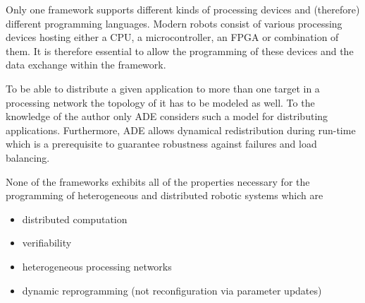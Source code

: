 \documentclass[a4paper,twocolumn]{esapub2005} %
\begin{document}
Only one framework supports different kinds of processing devices and (therefore) different programming languages.
Modern robots consist of various processing devices hosting either a CPU, a microcontroller, an FPGA or combination of them.
It is therefore essential to allow the programming of these devices and the data exchange within the framework.

To be able to distribute a given application to more than one target in a processing network the topology of it has to be modeled as well.
To the knowledge of the author only ADE considers such a model for distributing applications.
Furthermore, ADE allows dynamical redistribution during run-time which is a prerequisite to guarantee robustness against failures and load balancing.

None of the frameworks exhibits all of the properties necessary for the programming of heterogeneous and distributed robotic systems which are
\begin{itemize}
    \item distributed computation
    \item verifiability
    \item heterogeneous processing networks
    \item dynamic reprogramming (not reconfiguration via parameter updates)
\end{itemize}
\end{document}
